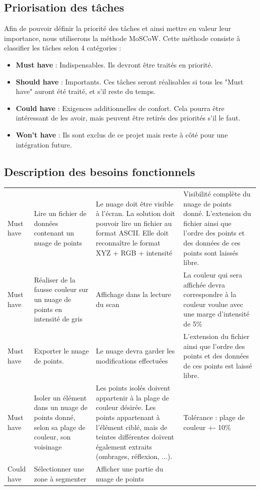 \documentclass[12pt,titlepage,french]{article}
\begin{document}
\subsection*{Priorisation des tâches}

Afin de pouvoir définir la priorité des tâches et ainsi mettre en valeur leur importance, nous utiliserons la méthode MoSCoW. Cette méthode consiste à classifier les tâches selon 4 catégories :

\begin{itemize}
    \item \textbf{Must have} : Indispensables. Ils devront être traités en priorité.
    \item \textbf{Should have} : Importants. Ces tâches seront réalisables si tous les "Must have" auront été traité, et s'il reste du temps.
    \item \textbf{Could have} : Exigences additionnelles de confort. Cela pourra être intéressant de les avoir, mais peuvent être retirés des priorités s'il le faut.
    \item \textbf{Won't have} : Ils sont exclus de ce projet mais reste à côté pour une intégration future.
\end{itemize}

\subsection*{Description des besoins fonctionnels}

\noindent\begin{tabu} to \toprule
     &&&\\\toprule
Must have
& Lire un fichier de données contenant un nuage de points
& Le nuage doit être visible à l'écran. La solution doit pouvoir lire un fichier au format ASCII. Elle doit reconnaître le format XYZ + RGB + intensité
& Visibilité complète du nuage de points donné. L'extension du fichier ainsi que l'ordre des points et des données de ces points sont laissés libre.\\\midrule
Must have
& Réaliser de la fausse couleur sur un nuage de points en intensité de gris
& Affichage dans la lecture du scan
& La couleur qui sera affichée devra correspondre à la couleur voulue avec une marge d'intensité de 5\%\\\midrule
Must have
& Exporter le nuage de points.
& Le nuage devra garder les modifications effectuées
& L'extension du fichier ainsi que l'ordre des points et des données de ces points est laissé libre.\\\midrule
Must have
& Isoler un élément dans un nuage de points donné, selon sa plage de couleur, son voisinage
& Les points isolés doivent appartenir à la plage de couleur désirée.
Les points appartenant à l'élément ciblé, mais de teintes différentes doivent également extraits (ombrages, réflexion, ...).
& Tolérance : plage de couleur +- 10\% \\\midrule
Could have
& Sélectionner une zone à segmenter
& Afficher une partie du nuage de points
& \\\bottomrule

\end{tabu}
\end{document}
